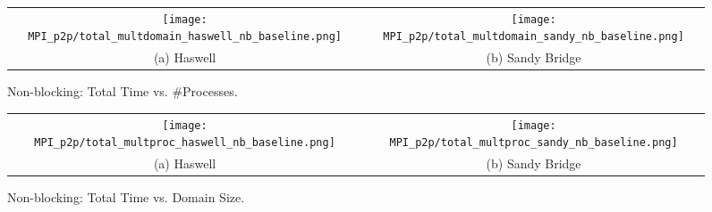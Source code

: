 \begin{enumerate}
	\begin{figure}[p] %
		\begin{tabular}{cc}
			\hspace*{-0.35\linewidth}\texttt{[image: MPI\_p2p/total\_multdomain\_haswell\_nb\_baseline.png]} & \hspace*{-0.05\linewidth}\texttt{[image: MPI\_p2p/total\_multdomain\_sandy\_nb\_baseline.png]} \\
			\hspace*{-0.45\linewidth}(a) Haswell & \hspace*{-0.15\linewidth}(b) Sandy Bridge\\[6pt]
		\end{tabular}
		\caption{Non-blocking: Total Time vs. \#Processes.}
		\label{fig:total_multdomain_nb_baseline}
	\end{figure}
	
	\begin{figure}[p] %
		\begin{tabular}{cc}
			\hspace*{-0.35\linewidth}\texttt{[image: MPI\_p2p/total\_multproc\_haswell\_nb\_baseline.png]} & \hspace*{-0.05\linewidth}\texttt{[image: MPI\_p2p/total\_multproc\_sandy\_nb\_baseline.png]} \\
			\hspace*{-0.45\linewidth}(a) Haswell & \hspace*{-0.15\linewidth}(b) Sandy Bridge\\[6pt]
		\end{tabular}
		\caption{Non-blocking: Total Time vs. Domain Size.}
		\label{fig:total_multproc_nb_baseline}
	\end{figure}

\end{enumerate}

